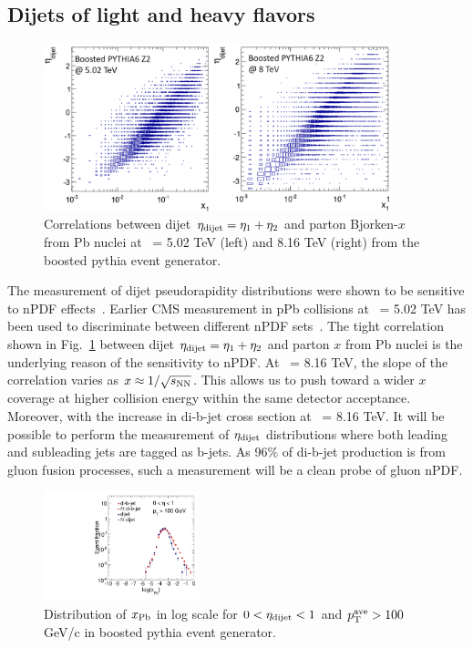 \subsection{Dijets of light and heavy flavors}


\begin{figure}[h]
\begin{center}
\includegraphics[width= 0.9\textwidth]{figures/x_vs_eta.png}
\caption{Correlations between dijet $\eta_{\rm dijet} = \eta_{1} + \eta_{2}$ 
and parton Bjorken-$x$ from Pb nuclei at \rootsNN\ = 5.02 TeV 
(left) and 8.16 TeV (right) from the boosted {\sc pythia} event generator.}
\label{fig:dijetCorr}
\end{center}
\end{figure}

The measurement of dijet pseudorapidity distributions were 
shown to be sensitive to nPDF effects~\cite{Paukkunen:2014pha}.
Earlier CMS measurement in pPb collisions at \rootsNN\ = 5.02 TeV
has been used to discriminate between different nPDF sets~\cite{Chatrchyan:2014hqa}. 
The tight correlation shown in Fig.~\ref{fig:dijetCorr} between 
dijet $\eta_{\rm dijet} = \eta_{1} + \eta_{2}$ and parton $x$ from Pb nuclei
is the underlying reason of the sensitivity to nPDF. At \rootsNN\ = 8.16 TeV, 
the slope of the correlation varies as $x \approx 1/\sqrt{s_{\rm NN}}$. 
This allows us to push toward a wider $x$ coverage at higher collision energy
within the same detector acceptance. Moreover, with the increase in 
di-b-jet cross section at \rootsNN\ = 8.16 TeV. It will be possible to perform 
the measurement of $\eta_{\rm dijet}$ distributions where both 
leading and subleading jets are tagged as b-jets. As 96\% of 
di-b-jet production is from gluon fusion processes, such a measurement
will be a clean probe of gluon nPDF.


\begin{figure}[h]
\begin{center}
\includegraphics[width= 0.4\textwidth]{figures/DistCompareBJetInclusive.pdf}
\caption{ Distribution of $x_{\rm Pb}$ in log scale for $0<\eta_{\rm dijet}<1$
and $p_\mathrm{T}^{\rm ave} > 100$ GeV/c in boosted {\sc pythia} event generator.}
\label{fig:distX}
\end{center}
\end{figure}

